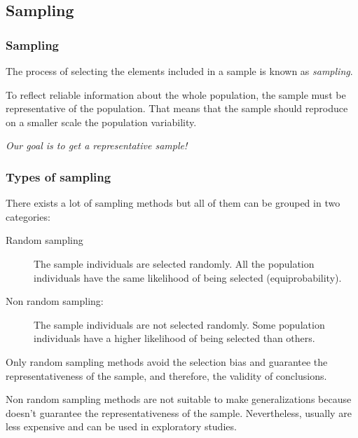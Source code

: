 \subsection{Sampling}
\begin{frame}
\frametitle{Sampling}
\begin{definition}[Sampling]
The process of selecting the elements included in a sample is known as \emph{sampling}.
\end{definition}
\begin{center}

\end{center}

To reflect reliable information about the whole population, the sample must be representative of the population.
That means that the sample should reproduce on a smaller scale the population variability.  

\begin{center}
\alert{\emph{Our goal is to get a representative sample!}}
\end{center}
\end{frame}


\begin{frame}
\frametitle{Types of sampling}
There exists a lot of sampling methods but all of them can be grouped in two categories:
\begin{description}
\item[Random sampling] The sample individuals are selected randomly. 
All the population individuals have the same likelihood of being selected (equiprobability).  
\item[Non random sampling:] The sample individuals are not selected randomly. 
Some population individuals have a higher likelihood of being selected than others. 
\end{description}

Only random sampling methods avoid the selection bias and guarantee the representativeness of the sample, and therefore,
the validity of conclusions. 

Non random sampling methods are not suitable to make generalizations because doesn't guarantee the representativeness 
of the sample.
Nevertheless, usually are less expensive and can be used in exploratory studies. 
\end{frame}



